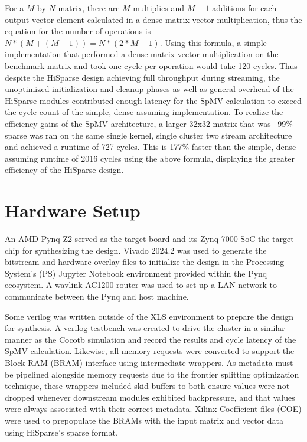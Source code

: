 For a $M$ by $N$ matrix, there are $M$ multiplies and $M-1$ additions for each output vector element calculated in a dense matrix-vector multiplication, thus the equation for the number of operations is $N*(M+(M-1))=N*(2*M - 1)$. Using this formula, a simple implementation that performed a dense matrix-vector multiplication on the benchmark matrix and took one cycle per operation would take 120 cycles. Thus despite the HiSparse design achieving full throughput during streaming, the unoptimized initialization and cleanup-phases as well as general overhead of the HiSparse modules contributed enough latency for the SpMV calculation to exceed the cycle count of the simple, dense-assuming implementation. To realize the efficiency gains of the SpMV architecture, a larger 32x32 matrix that was ~99\% sparse was ran on the same single kernel, single cluster two stream architecture and achieved a runtime of 727 cycles. This is 177\% faster than the simple, dense-assuming runtime of 2016 cycles using the above formula, displaying the greater efficiency of the HiSparse design.



\section{Hardware Setup}
An AMD Pynq-Z2 served as the target board and its Zynq-7000 SoC the target chip for synthesizing the design. Vivado 2024.2 \cite{amdvivado} was used to generate the bitstream and hardware overlay files to initialize the design in the Processing System's (PS) Jupyter Notebook environment provided within the Pynq ecosystem. A wavlink AC1200 router was used to set up a LAN network to communicate between the Pynq and host machine.

Some verilog was written outside of the XLS environment to prepare the design for synthesis. A verilog testbench was created to drive the cluster in a similar manner as the Cocotb simulation and record the results and cycle latency of the SpMV calculation. Likewise, all memory requests were converted to support the Block RAM (BRAM) interface \cite{bram} using intermediate wrappers. As metadata must be pipelined alongside memory requests due to the frontier splitting optimization technique, these wrappers included skid buffers to both ensure values were not dropped whenever downstream modules exhibited backpressure, and that values were always associated with their correct metadata. Xilinx Coefficient files (COE) \cite{coefile} were used to prepopulate the BRAMs with the input matrix and vector data using HiSparse's sparse format.

